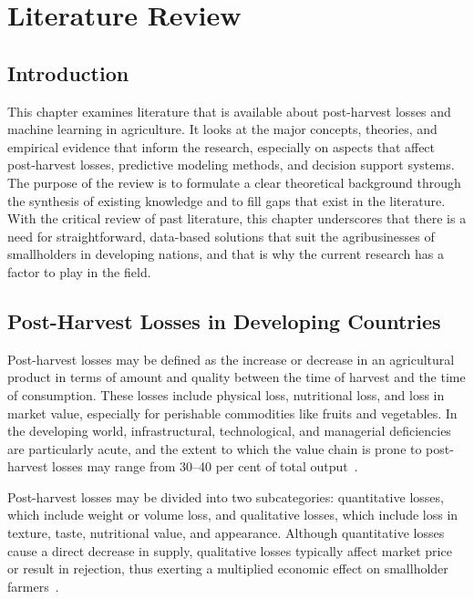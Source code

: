 \chapter{Literature Review}
\label{chap:found}

\section{Introduction}

This chapter examines literature that is available about post-harvest losses and machine learning
in agriculture. It looks at the major concepts, theories, and empirical evidence that inform the
research, especially on aspects that affect post-harvest losses, predictive modeling methods, and
decision support systems. The purpose of the review is to formulate a clear theoretical background
through the synthesis of existing knowledge and to fill gaps that exist in the literature. With the
critical review of past literature, this chapter underscores that there is a need for
straightforward, data-based solutions that suit the agribusinesses of smallholders in developing
nations, and that is why the current research has a factor to play in the field.


\section{Post-Harvest Losses in Developing Countries}

Post-harvest losses may be defined as the increase or decrease in an agricultural product in terms
of amount and quality between the time of harvest and the time of consumption. These losses include
physical loss, nutritional loss, and loss in market value, especially for perishable commodities
like fruits and vegetables. In the developing world, infrastructural, technological, and managerial
deficiencies are particularly acute, and the extent to which the value chain is prone to
post-harvest losses may range from 30--40 per cent of total output~\cite{rajapaksha2021reducing}.

Post-harvest losses may be divided into two subcategories: quantitative losses, which include
weight or volume loss, and qualitative losses, which include loss in texture, taste, nutritional
value, and appearance. Although quantitative losses cause a direct decrease in supply, qualitative
losses typically affect market price or result in rejection, thus exerting a multiplied economic
effect on smallholder farmers~\cite{wakene2024comprehensive}.

